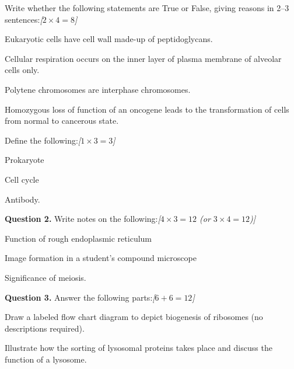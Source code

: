\documentclass[11pt,a4paper]{article}
\newcommand{\pts}[1]{\hfill   \textit{[#1]}}
\begin{document}
\begin{parts}
  \item Write whether the following statements are True or False, giving reasons in 2--3 sentences:\pts{$2  \times 4 = 8$}
  
\begin{parts}
    \item Eukaryotic cells have cell wall made-up of peptidoglycans.
    \item Cellular respiration occurs on the inner layer of plasma membrane of alveolar cells only.
    \item Polytene chromosomes are interphase chromosomes.
    \item Homozygous loss of function of an oncogene leads to the transformation of cells from normal to cancerous state.
  \end{parts}

  \item Define the following:\pts{$1  \times 3 = 3$}
  
\begin{parts}
    \item Prokaryote
    \item Cell cycle
    \item Antibody.
  \end{parts}
\end{parts}

\medskip


\noindent   \textbf{Question 2.} Write notes on the following:\pts{$4  \times 3 = 12$ (or $3  \times 4 = 12$)}

\begin{parts}
  \item Function of rough endoplasmic reticulum
  \item Image formation in a student's compound microscope
  \item Significance of meiosis.
\end{parts}

\medskip


\noindent   \textbf{Question 3.} Answer the following parts:\pts{$6 + 6 = 12$}

\begin{parts}
  \item Draw a labeled flow chart diagram to depict biogenesis of ribosomes (no descriptions required).
  \item Illustrate how the sorting of lysosomal proteins takes place and discuss the function of a lysosome.
\end{parts}
\end{document}
